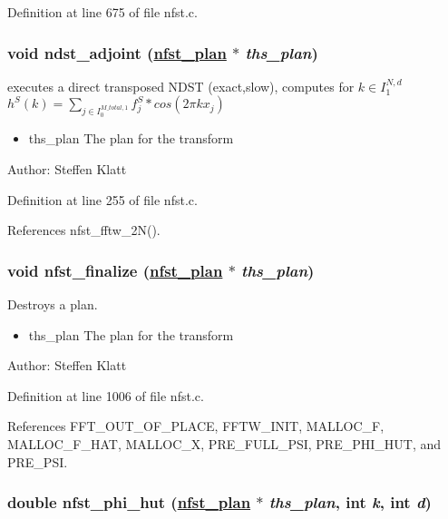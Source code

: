 Definition at line 675 of file nfst.c.\hypertarget{group__nfsct_ga25}{
\subsubsection[ndst\_\-adjoint]{\setlength{\rightskip}{0pt plus 5cm}void ndst\_\-adjoint (\hyperlink{structnfst__plan}{nfst\_\-plan} $\ast$ {\em ths\_\-plan})}}
\label{group__nfsct_ga25}


executes a direct transposed NDST (exact,slow), computes for $k \in I_1^{N,d}$ $h^S(k) = \sum_{j \in I_0^{M\_total,1}} f_j^S * cos(2 \pi k x_j)$ 

\begin{itemize}
\item ths\_\-plan The plan for the transform\end{itemize}
\begin{Desc}
\item[Author:]Steffen Klatt \end{Desc}


Definition at line 255 of file nfst.c.

References nfst\_\-fftw\_\-2N().\hypertarget{group__nfsct_ga26}{
\subsubsection[nfst\_\-finalize]{\setlength{\rightskip}{0pt plus 5cm}void nfst\_\-finalize (\hyperlink{structnfst__plan}{nfst\_\-plan} $\ast$ {\em ths\_\-plan})}}
\label{group__nfsct_ga26}


Destroys a plan. 

\begin{itemize}
\item ths\_\-plan The plan for the transform\end{itemize}
\begin{Desc}
\item[Author:]Steffen Klatt \end{Desc}


Definition at line 1006 of file nfst.c.

References FFT\_\-OUT\_\-OF\_\-PLACE, FFTW\_\-INIT, MALLOC\_\-F, MALLOC\_\-F\_\-HAT, MALLOC\_\-X, PRE\_\-FULL\_\-PSI, PRE\_\-PHI\_\-HUT, and PRE\_\-PSI.\hypertarget{group__nfsct_ga28}{
\subsubsection[nfst\_\-phi\_\-hut]{\setlength{\rightskip}{0pt plus 5cm}double nfst\_\-phi\_\-hut (\hyperlink{structnfst__plan}{nfst\_\-plan} $\ast$ {\em ths\_\-plan}, int {\em k}, int {\em d})}}
\label{group__nfsct_ga28}


